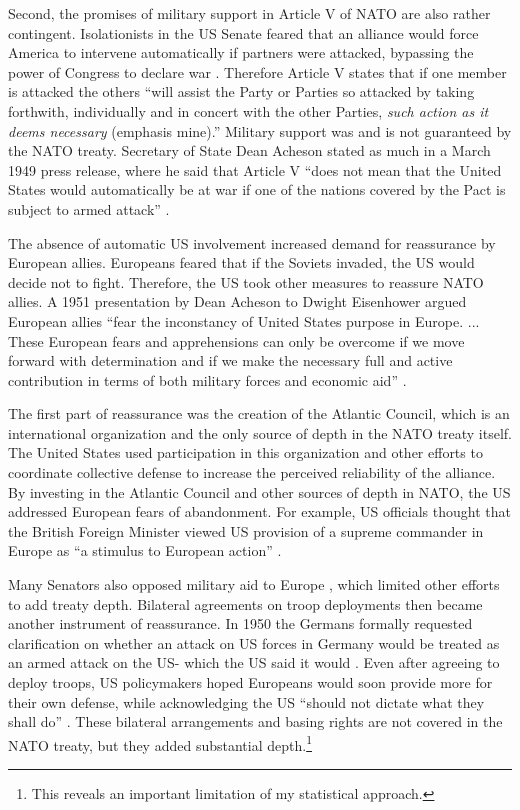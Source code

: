 \documentclass[12pt]{article}
\begin{document}
Second, the promises of military support in Article V of NATO are also rather contingent. 
Isolationists in the US Senate feared that an alliance would force America to intervene automatically if partners were attacked, bypassing the power of Congress to declare war \citep[pg. 280-1]{Acheson1969}.
Therefore Article V states that if one member is attacked the others ``will assist the Party or Parties so attacked by taking forthwith, individually and in concert with the other Parties, \emph{such action as it deems necessary} (emphasis mine).'' 
Military support was and is not guaranteed by the NATO treaty. 
Secretary of State Dean Acheson stated as much in a March 1949 press release, where he said that Article V ``does not mean that the United States would automatically be at war if one of the nations covered by the Pact is subject to armed attack'' \citep{Acheson1949}. 


The absence of automatic US involvement increased demand for reassurance by European allies. 
Europeans feared that if the Soviets invaded, the US would decide not to fight. 
Therefore, the US took other measures to reassure NATO allies. 
A 1951 presentation by Dean Acheson to Dwight Eisenhower argued European allies ``fear the inconstancy of United States purpose in Europe. ... These European fears and apprehensions can only be overcome if we move forward with determination and if we make the necessary full and active contribution in terms of both military forces and economic aid'' \citep[pg. 3]{Acheson1951}. 


The first part of reassurance was the creation of the Atlantic Council, which is an international organization and the only source of depth in the NATO treaty itself. 
The United States used participation in this organization and other efforts to coordinate collective defense to increase the perceived reliability of the alliance. 
By investing in the Atlantic Council and other sources of depth in NATO, the US addressed European fears of abandonment. 
For example, US officials thought that the British Foreign Minister viewed US provision of a supreme commander in Europe as ``a stimulus to European action'' \citep{Acheson1950}. 


Many Senators also opposed military aid to Europe \citep[pg 285]{Acheson1969}, which limited other efforts to add treaty depth. 
Bilateral agreements on troop deployments then became another instrument of reassurance. 
In 1950 the Germans formally requested clarification on whether an attack on US forces in Germany would be treated as an armed attack on the US- which the US said it would \citep[pg. 395]{Acheson1969}.  
Even after agreeing to deploy troops, US policymakers hoped Europeans would soon provide more for their own defense, while acknowledging the US ``should not dictate what they shall do'' \citep[pg. 2]{Johnson1950}. 
These bilateral arrangements and basing rights are not covered in the NATO treaty, but they added substantial depth.\footnote{This reveals an important limitation of my statistical approach.}  
\end{document}

